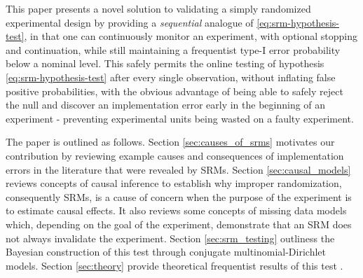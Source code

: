 \documentclass[11pt]{article}
\begin{document}
This paper presents a novel solution to validating a simply randomized experimental design by providing a \textit{sequential} analogue of \ref{eq:srm-hypothesis-test}, in that one can continuously monitor an experiment, with optional stopping and continuation, while still maintaining a frequentist type-I error probability below a nominal level. This safely permits the online testing of hypothesis \ref{eq:srm-hypothesis-test} after every single observation, without inflating false positive probabilities, with the obvious advantage of being able to safely reject the null and discover an implementation error early in the beginning of an experiment - preventing experimental units being wasted on a faulty experiment.

The paper is outlined as follows. Section \ref{sec:causes_of_srms} motivates our contribution by reviewing example causes and consequences of implementation errors in the literature that were revealed by SRMs. Section \ref{sec:causal_models} reviews concepts of causal inference to establish why improper randomization, consequently SRMs, is a cause of concern when the purpose of the experiment is to estimate causal effects. It also reviews some concepts of missing data models which, depending on the goal of the experiment, demonstrate that an SRM does not always invalidate the experiment. Section \ref{sec:srm_testing} outliness the Bayesian construction of this test through conjugate multinomial-Dirichlet models. Section \ref{sec:theory} provide theoretical frequentist results of this test .
\end{document}
